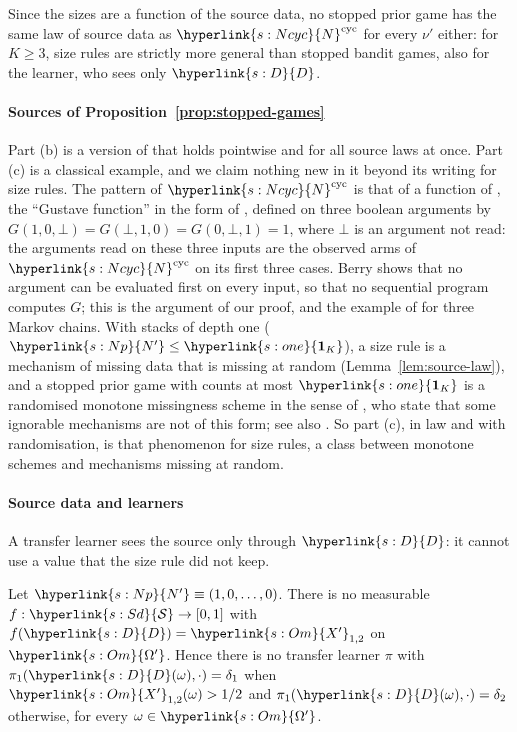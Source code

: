 \documentclass[11pt]{article}
\newcommand{\sy}[2]{\hyperlink{#1}{#2}}
\newcommand{\Sd}{\sy{s:Sd}{\mathcal{S}}}
\newcommand{\one}{\sy{s:one}{\mathbf{1}_{K}}}
\newcommand{\Np}{\sy{s:Np}{N'}}
\newcommand{\Dd}{\sy{s:D}{D}}
\newcommand{\Om}{\sy{s:Om}{\Omega'}}
\newcommand{\Xp}{\sy{s:Om}{X'}}
\newcommand{\Ncyc}{\sy{s:Ncyc}{N}^{\mathrm{cyc}}}
\begin{document}
Since the sizes are a function of the source data, no stopped prior game has the same law of source
data as $\Ncyc$ for every $\nu'$ either: for $K\ge3$, size rules are strictly more general than
stopped bandit games, also for the learner, who sees only $\Dd$.

\paragraph{Sources of Proposition~\ref{prop:stopped-games}} Part (b) is a version of
\citet[Theorem~4]{MV81} that holds pointwise and for all source laws at once. Part (c) is a
classical example, and we claim nothing new in it beyond its writing for size rules. The pattern of
$\Ncyc$ is that of a function of \citet[Proposition~II.2.2]{Ber76}, the ``Gustave function'' in
the form of \citet{Cur03}, defined on three boolean arguments by $G(1,0,\bot)=G(\bot,1,0)=G(0,\bot,1)=1$, where $\bot$ is an argument not
read: the arguments read on these three inputs are the observed arms of $\Ncyc$ on its first three
cases. Berry shows that no argument can be evaluated first on every input, so that no sequential
program computes $G$; this is the argument of our proof, and the example of
\citet[Section~5.2]{MV81} for three Markov chains. With stacks of depth one ($\Np\le\one$), a size
rule is a mechanism of missing data that is missing at random (Lemma~\ref{lem:source-law}), and a
stopped prior game with counts at most $\one$ is a randomised monotone missingness scheme in the
sense of \citet{RG97}, who
state that some ignorable mechanisms are not of this form; see also \citet{GR97}. So part (c), in
law and with randomisation, is that phenomenon for size rules, a class between monotone schemes and
mechanisms missing at random.

\paragraph{Source data and learners} A transfer learner sees the source only through $\Dd$: it cannot
use a value that the size rule did not keep.

\begin{lemma}\label{lem:learner-exclusion}
Let $\Np\equiv(1,0,\dots,0)$. There is no measurable $f:\Sd\to[0,1]$ with $f(\Dd)=\Xp_{1,2}$ on
$\Om$. Hence there is no transfer learner $\pi$ with $\pi_1(\Dd(\omega),\cdot)=\delta_{1}$ when
$\Xp_{1,2}(\omega)>1/2$ and $\pi_1(\Dd(\omega),\cdot)=\delta_2$ otherwise, for every $\omega\in\Om$.
\end{lemma}
\end{document}
